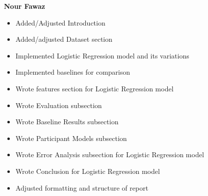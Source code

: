 \textbf{Nour Fawaz}
\begin{itemize}
    \item Added/Adjusted Introduction
    \item Added/adjusted Dataset section
    \item Implemented Logistic Regression model and its variations
    \item Implemented baselines for comparison
    \item Wrote features section for Logistic Regression model
    \item Wrote Evaluation subsection
    \item Wrote Baseline Results subsection
    \item Wrote Participant Models subsection
    \item Wrote Error Analysis subsection for Logistic Regression model
    \item Wrote Conclusion for Logistic Regression model
    \item Adjusted formatting and structure of report
\end{itemize}